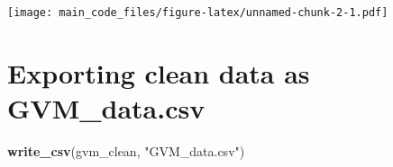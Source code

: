 \documentclass[
]{article}
\newenvironment{Shaded}{\begin{snugshade}}{\end{snugshade}}
\newcommand{\FunctionTok}[1]{\textcolor[rgb]{0.13,0.29,0.53}{\textbf{#1}}}
\newcommand{\NormalTok}[1]{#1}
\newcommand{\StringTok}[1]{\textcolor[rgb]{0.31,0.60,0.02}{#1}}
\begin{document}
\texttt{[image: main\_code\_files/figure-latex/unnamed-chunk-2-1.pdf]}

\hypertarget{exporting-clean-data-as-gvm_data.csv}{%
\section{Exporting clean data as
GVM\_data.csv}\label{exporting-clean-data-as-gvm_data.csv}}

\begin{Shaded}
\begin{Highlighting}[]
\FunctionTok{write\_csv}\NormalTok{(gvm\_clean, }\StringTok{"GVM\_data.csv"}\NormalTok{)}
\end{Highlighting}
\end{Shaded}
\end{document}

